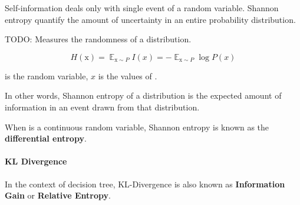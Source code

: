 \documentclass{ctexart}
\DeclareMathOperator{\E}{\mathbb{E}}
\begin{document}
Self-information deals only with single event of a random variable. Shannon entropy quantify the amount of uncertainty in an entire probability distribution.

TODO: Measures the randomness of a distribution.

\begin{equation}
    H( \text{x} ) = \E_{\text{x} \sim P} I(x) = -\E_{\text{x} \sim P} \log P(x)
\end{equation}

 is the random variable, \( x \) is the values of .

In other words, Shannon entropy of a distribution is the expected amount of information in an event drawn from that distribution.

When  is a continuous random variable, Shannon entropy is known as the \textbf{differential entropy}.

\paragraph{KL Divergence}


In the context of decision tree, KL-Divergence is also known as \textbf{Information Gain} or \textbf{Relative Entropy}.
\end{document}
